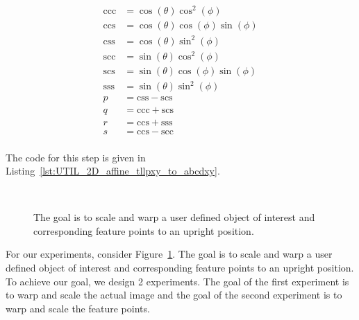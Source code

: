 \begin{equation*}
\begin{array}{llll}
\mathrm{ccc} &= \cos(\theta) \cos^2(\phi)\\
\mathrm{ccs} &= \cos(\theta) \cos(\phi) \sin(\phi)\\
\mathrm{css} &= \cos(\theta) \sin^2(\phi)\\
\mathrm{scc} &= \sin(\theta) \cos^2(\phi) \\
\mathrm{scs} &= \sin(\theta) \cos(\phi) \sin(\phi)\\
\mathrm{sss} &= \sin(\theta) \sin^2(\phi)\\
p   &=  \mathrm{css} - \mathrm{scs}\\
q   &=  \mathrm{ccc} + \mathrm{scs}\\
r   &= \mathrm{ccs} + \mathrm{sss}\\
s   &=  \mathrm{ccs} - \mathrm{scc}\\
\end{array}
\end{equation*}

The code for this step is given in Listing~\ref{lst:UTIL_2D_affine_tllpxy_to_abcdxy}.

								\begin{figure}[t]
								\centering
								\\
								\caption{The goal is to scale and warp a user defined object of interest and corresponding feature points to an upright position.}
								\label{Fig:overall}
								\end{figure}



For our experiments, consider Figure~\ref{Fig:overall}.  The goal is to scale and warp a user defined object of interest and corresponding feature points to an upright position.  To achieve our goal, we design 2 experiments.  The goal of the first experiment is to warp and scale the actual image and the goal of the second experiment is to warp and scale the feature points.

